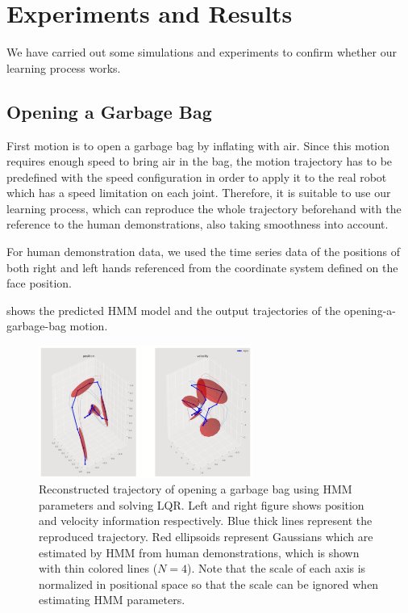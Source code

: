 \section{Experiments and Results}

We have carried out some simulations and experiments to confirm whether our learning process works.

\subsection{Opening a Garbage Bag}

First motion is to open a garbage bag by inflating with air. Since this motion requires enough speed to bring air in the bag, the motion trajectory has to be predefined with the speed configuration in order to apply it to the real robot which has a speed limitation on each joint. Therefore, it is suitable to use our learning process, which can reproduce the whole trajectory beforehand with the reference to the human demonstrations, also taking smoothness into account.

For human demonstration data, we used the time series data of the positions of both right and left hands referenced from the coordinate system defined on the face position.

 shows the predicted HMM model and the output trajectories of the opening-a-garbage-bag motion.

\begin{figure}[htbp]
  \begin{center}
    \includegraphics[clip,width=7.0cm]{./figs/open_garbage_bag_repro.png}
    \caption{Reconstructed trajectory of opening a garbage bag using HMM parameters and solving LQR. Left and right figure shows position and velocity information respectively. Blue thick lines represent the reproduced trajectory. Red ellipsoids represent Gaussians which are estimated by HMM from human demonstrations, which is shown with thin colored lines (\( N = 4 \)). Note that the scale of each axis is normalized in positional space so that the scale can be ignored when estimating HMM parameters.}
    \label{figure:open_garbage_bag_repro}
  \end{center}
  \vspace{-3mm}
\end{figure}

